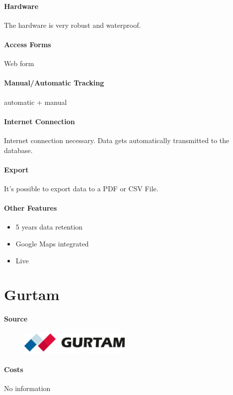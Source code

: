 \paragraph{Hardware}The hardware is very robust and waterproof.
\paragraph{Access Forms}Web form
\paragraph{Manual/Automatic Tracking}automatic + manual
\paragraph{Internet Connection}Internet connection necessary.
Data gets automatically  transmitted to the database.
\paragraph{Export}It’s possible to export data to a PDF or CSV File.
\paragraph{Other Features}
\begin{itemize}
\item 5 years data retention  
\item Google Maps integrated
\item Live
\end{itemize}
\newpage

\section{Gurtam}
\paragraph{Source} 
\begin{figure}
  \begin{center}
    \includegraphics[width=0.48\textwidth]{gurtam}
  \end{center}
\end{figure}
\paragraph{Costs} No information 
